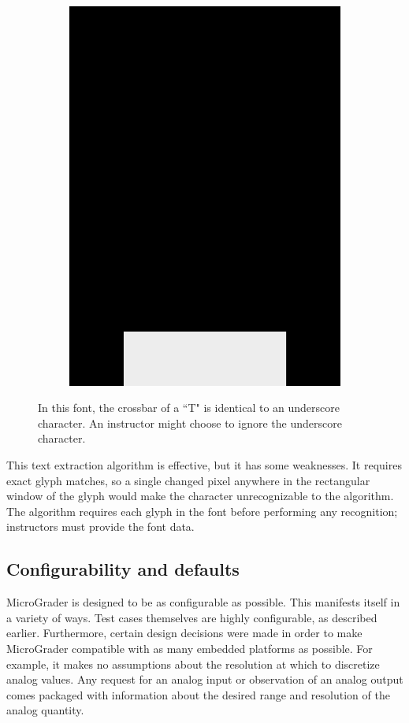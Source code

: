 \documentclass[12pt]{article}
\begin{document}
\begin{figure}
\begin{subfigure}[b]{.3\linewidth}
\includegraphics[width=\linewidth]{glyph-underscore.png}
\label{fig:glyph-underscore}
\end{subfigure}
\caption{In this font, the crossbar of a ``T" is identical to an underscore character.  An instructor might choose to ignore the underscore character.}
\label{fig:bad-ocr}
\end{figure}

This text extraction algorithm is effective, but it has some weaknesses.  It requires exact glyph matches, so a single changed pixel anywhere in the rectangular window of the glyph would make the character unrecognizable to the algorithm.  The algorithm requires each glyph in the font before performing any recognition; instructors must provide the font data.

\subsection{Configurability and defaults}
\label{sec:config}
MicroGrader is designed to be as configurable as possible.  This manifests itself in a variety of ways.  Test cases themselves are highly configurable, as described earlier.  Furthermore, certain design decisions were made in order to make MicroGrader compatible with as many embedded platforms as possible.  For example, it makes no assumptions about the resolution at which to discretize analog values.  Any request for an analog input or observation of an analog output comes packaged with information about the desired range and resolution of the analog quantity.
\end{document}
